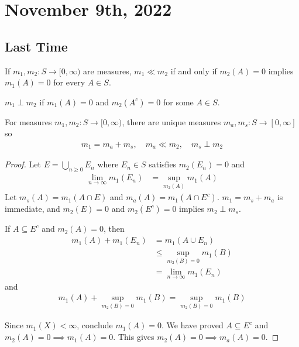 \section{November 9th, 2022}

\subsection*{Last Time}

\begin{definition}
	If $m_1, m_2 : S \to [0, \infty)$ are measures, $m_1 \ll m_2$
	if and only if $m_{2} (A) = 0 $ implies $m_{1} (A) = 0$ for every $A \in S$.
\end{definition}

\begin{definition}
	$m_1 \perp m_2$ if $m_1(A) = 0$ and $m_2(A^c) = 0$ for some $A \in S$.
\end{definition}


\begin{theorem}
	For measures $m_1, m_2 : S \to [0, \infty)$, there are unique measures  $m_a, m_{s} : S \to [0, \infty]$ so
	\begin{align*}
		m_1 = m_a + m_s, \quad m_a \ll m_2, \quad m_s \perp m_2
	\end{align*}
\end{theorem}

\begin{proof}
	Let $E = \bigcup_{n \geq 0} E_{n}$ where $E_{n} \in S$ satisfies
	 $m_{2} (E_{n}) = 0$ and
	 \begin{align*}
		 \lim_{n \to \infty} m_{1} (E_{n}) &= \sup_{m_{2} (A)} m_1 (A)
	 \end{align*}
	Let $m_s (A) = m_1 (A \cap E)$ and $m_a (A) = m_{1} (A \cap E^c)$.
	$m_1 = m_s + m_a$ is immediate, and
	$m_2 (E) = 0$ and $m_2 (E^c) = 0$ implies $m_2 \perp m_s$.

	 If $A \subseteq E^c$ and $m_2 (A) = 0$, then
	 \begin{align*}
		 m_1 (A) + m_1 (E_n) &= m_1 (A \cup E_n) \\
							 &\leq \sup_{m_2 (B) = 0} m_1 (B) \\
							 &= \lim_{n \to \infty} m_1 (E_n)
	 \end{align*}
	 and
	 \begin{align*}
		m_1 (A) + \sup_{m_2 (B) = 0} m_1 (B) = \sup_{m_2 (B) = 0} m_1 (B)
	 \end{align*}

	 Since $m_1 (X) < \infty$, conclude $m_1 (A) = 0$.
	 We have proved  $A \subseteq  E^c$ and $m_2 (A) = 0 \implies m_1 (A) = 0$.
	 This gives $m_2 (A) = 0 \implies m_a (A) = 0$.
\end{proof}


